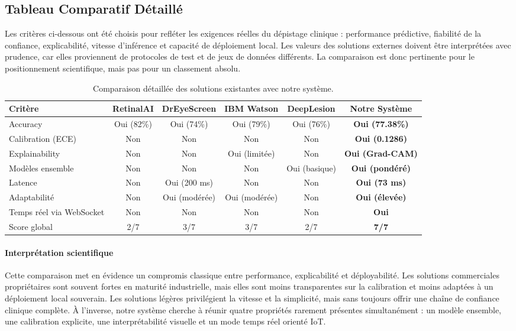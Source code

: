 \documentclass[12pt,a4paper,oneside]{report}
\begin{document}
\subsection{Tableau Comparatif Détaillé}

Les critères ci-dessous ont été choisis pour refléter les exigences réelles
du dépistage clinique : performance prédictive, fiabilité de la confiance,
explicabilité, vitesse d'inférence et capacité de déploiement local. Les
valeurs des solutions externes doivent être interprétées avec prudence, car
elles proviennent de protocoles de test et de jeux de données différents.
La comparaison est donc pertinente pour le positionnement scientifique, mais
pas pour un classement absolu.

\begin{table}[H]
\centering
\renewcommand{\arraystretch}{1.3}
\caption{Comparaison détaillée des solutions existantes avec notre système.}
\label{tab:comparative_apps_detail}
\begin{tabular}{|p{2.7cm}|c|c|c|c|c|}
\hline
\textbf{Critère} & \textbf{RetinalAI} & \textbf{DrEyeScreen} & \textbf{IBM Watson} & \textbf{DeepLesion} & \textbf{Notre Système} \\
\hline
Accuracy & Oui (82\%) & Oui (74\%) & Oui (79\%) & Oui (76\%) & \textbf{Oui (77.38\%)} \\
\hline
Calibration (ECE) & Non & Non & Non & Non & \textbf{Oui (0.1286)} \\
\hline
Explainability & Non & Non & Oui (limitée) & Non & \textbf{Oui (Grad-CAM)} \\
\hline
Modèles ensemble & Non & Non & Non & Oui (basique) & \textbf{Oui (pondéré)} \\
\hline
Latence & Non & Oui (200 ms) & Non & Non & \textbf{Oui (73 ms)} \\
\hline
Adaptabilité & Non & Oui (modérée) & Oui (modérée) & Non & \textbf{Oui (élevée)} \\
\hline
Temps réel via WebSocket & Non & Non & Non & Non & \textbf{Oui} \\
\hline
Score global & 2/7 & 3/7 & 3/7 & 2/7 & \textbf{7/7} \\
\hline
\end{tabular}
\end{table}

\paragraph{Interprétation scientifique}
Cette comparaison met en évidence un compromis classique entre performance,
explicabilité et déployabilité. Les solutions commerciales propriétaires sont
souvent fortes en maturité industrielle, mais elles sont moins transparentes
sur la calibration et moins adaptées à un déploiement local souverain. Les
solutions légères privilégient la vitesse et la simplicité, mais sans toujours
offrir une chaîne de confiance clinique complète. À l'inverse, notre système
cherche à réunir quatre propriétés rarement présentes simultanément : un modèle
ensemble, une calibration explicite, une interprétabilité visuelle et un mode
temps réel orienté IoT.
\end{document}
